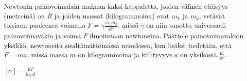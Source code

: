 \begin{tehtavasivu}
\begin{tehtava}
Newtonin painovoimalain mukaan kaksi kappaletta, joiden välinen etäisyys (metreinä) on $R$ ja joiden massat (kilogrammoina) ovat $m_1$ ja $m_2$, vetävät toisiaan puoleensa voimalla $F=\gamma \frac{m_1m_2}{R^2}$, missä $\gamma$ on niin sanottu universaali painovoimavakio ja voima $F$ ilmoitetaan newtoneina. Päättele painovoimavakion yksikkö, newtoneita sisältämättömässä muodossa, kun lisäksi tiedetään, että $F=ma$, missä massa $m$ on kilogrammoina ja kiihtyvyys $a$ on yksikössä $\mathrm{\frac{m}{s^2}}$.
	\begin{vastaus}
	$[\gamma]=\mathrm{\frac{m^3}{kg\,s^2}}$
	\end{vastaus} 
\end{tehtava}

\end{tehtavasivu}